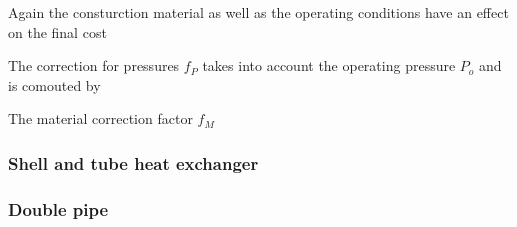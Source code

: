 		Again the consturction material as well as the operating conditions have an effect on the 
		final cost 
		
		The correction for pressures $f_P$ takes into account the operating pressure $P_o$ and 
		is comouted by 
		
		The material correction factor $f_M$ 
		
		\subsubsection{Shell and tube heat exchanger}
		
		\subsubsection{Double pipe}
		